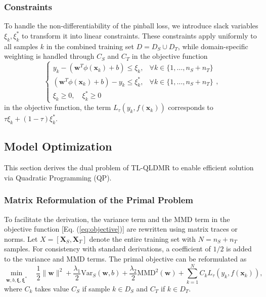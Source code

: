 \documentclass[a4paper]{cas-sc}
\begin{document}
\subsubsection{Constraints}
To handle the non-differentiability of the pinball loss, we introduce slack variables $\xi_k, \xi_k^*$ to transform it into linear constraints. These constraints apply uniformly to all samples $k$ in the combined training set $D = D_S \cup D_T$, while domain-specific weighting is handled through $C_S$ and $C_T$ in the objective function
\begin{equation}
\label{eq:constraints}
\begin{cases}
y_k - (\boldsymbol{w}^T\phi(\boldsymbol{x}_k) + b) \le \xi_k, & \forall k \in \{1, \dots, n_S + n_T\} \\
(\boldsymbol{w}^T\phi(\boldsymbol{x}_k) + b) - y_k \le \xi_k^*, & \forall k \in \{1, \dots, n_S + n_T\} \\
\xi_k \ge 0, \quad \xi_k^* \ge 0
\end{cases},
\end{equation}
in the objective function, the term $L_{\tau}(y_k, f(\boldsymbol{x}_k))$ corresponds to $\tau \xi_k + (1-\tau) \xi_k^*$.

\subsection{Model Optimization}\label{optimization}
This section derives the dual problem of TL-QLDMR to enable efficient solution via Quadratic Programming (QP).

\subsubsection{Matrix Reformulation of the Primal Problem}
To facilitate the derivation, the variance term and the MMD term in the objective function [Eq. (\ref{eq:objective})] are rewritten using matrix traces or norms. Let $X = [\boldsymbol{X}_S, \boldsymbol{X}_T]$ denote the entire training set with $N = n_S + n_T$ samples.
For consistency with standard derivations, a coefficient of $1/2$ is added to the variance and MMD terms. The primal objective can be reformulated as
\begin{equation}
\label{eq:primal_matrix}
\min_{\boldsymbol{w}, b, \boldsymbol{\xi}, \boldsymbol{\xi}^*} \quad \frac{1}{2} \|\boldsymbol{w}\|^2 + \frac{\lambda_1}{2} \text{Var}_S(\boldsymbol{w}, b) + \frac{\lambda_2}{2} \text{MMD}^2(\boldsymbol{w}) + \sum_{k=1}^N C_k L_\tau(y_k, f(\boldsymbol{x}_k)),
\end{equation}
where $C_k$ takes value $C_S$ if sample $k \in D_S$ and $C_T$ if $k \in D_T$.
\end{document}
